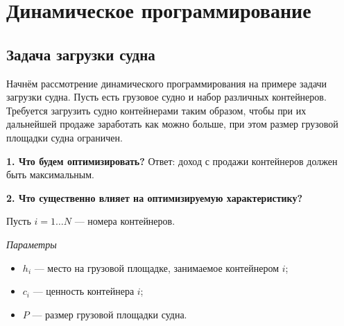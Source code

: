 \chapter{Динамическое программирование}

\noindent{}

\section{Задача загрузки судна}\label{pr:loading_vessel}

Начнём рассмотрение динамического программирования на примере задачи загрузки судна. Пусть есть грузовое судно и набор различных контейнеров. Требуется загрузить судно контейнерами таким образом, чтобы при их дальнейшей продаже заработать как можно больше, при этом размер грузовой площадки судна ограничен.

\begin{figure}[H]
	\centering
	\def\svgwidth{\linewidth}
	\fbox{}
\end{figure}

\bigskip

\textbf{1. Что будем оптимизировать?} Ответ: доход с продажи контейнеров должен быть максимальным.

\bigskip

\textbf{2. Что существенно влияет на оптимизируемую характеристику?}

Пусть $i=1 \dots N$ --- номера контейнеров.

\bigskip

\textit{Параметры}

\begin{itemize}[nosep]
	\item $h_i$ --- место на грузовой площадке, занимаемое контейнером $i$;
	
	\item $c_i$ --- ценность контейнера $i$;
	
	\item $P$ --- размер грузовой площадки судна.
\end{itemize}

